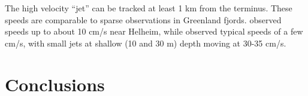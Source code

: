 \documentclass[review]{igs}
\begin{document}
The high velocity “jet” can be tracked at least 1 km from the terminus.  These speeds are comparable to sparse observations in Greenland fjords.  \citet{straneo2012characteristics} observed speeds up to about 10 cm/s near Helheim, while \citet{rignot2010rapid} observed typical speeds of a few cm/s, with small jets at shallow (10 and 30 m) depth moving at 30-35 cm/s. 


% 
% 
% 


\section{Conclusions}
\end{document}
